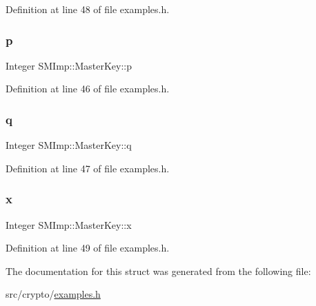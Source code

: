 Definition at line 48 of file examples.\+h.

\mbox{\label{structSMImp_1_1MasterKey_a02c412cc3787c75f2c4ddc1ac5f5e97a}} 
\subsubsection{\texorpdfstring{p}{p}}
{\footnotesize\ttfamily Integer S\+M\+Imp\+::\+Master\+Key\+::p}



Definition at line 46 of file examples.\+h.

\mbox{\label{structSMImp_1_1MasterKey_abe015bcc8fd5562a2b9d9dd55cc69a02}} 
\subsubsection{\texorpdfstring{q}{q}}
{\footnotesize\ttfamily Integer S\+M\+Imp\+::\+Master\+Key\+::q}



Definition at line 47 of file examples.\+h.

\mbox{\label{structSMImp_1_1MasterKey_a8435c91db233b14df5634fd9210ad1de}} 
\subsubsection{\texorpdfstring{x}{x}}
{\footnotesize\ttfamily Integer S\+M\+Imp\+::\+Master\+Key\+::x}



Definition at line 49 of file examples.\+h.



The documentation for this struct was generated from the following file\+:\begin{DoxyCompactItemize}
\item 
src/crypto/\hyperlink{examples_8h}{examples.\+h}\end{DoxyCompactItemize}
